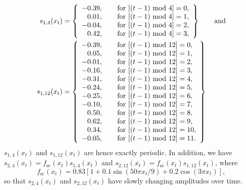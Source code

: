 \begin{align*}
s_{1,4}(x_t)&=\left\{\begin{array}{rl}
-0.39, & \hspace{3mm}\text{ for }[(t-1)\text{ mod } 4] = 0,\\ 0.01, & \hspace{3mm}\text{ for }[(t-1)\text{ mod } 4] = 1,\\ -0.04, & \hspace{3mm}\text{ for }[(t-1)\text{ mod } 4] = 2,\\ 0.42, & \hspace{3mm}\text{ for }[(t-1)\text{ mod } 4] = 3,\end{array}\right\}  \hspace{6mm}\text{ and}\\
s_{1,12}(x_t)&=\left\{\begin{array}{rl}
-0.39, & \hspace{3mm}\text{ for }[(t-1)\text{ mod } 12] = 0,\\
0.05, & \hspace{3mm}\text{ for }[(t-1)\text{ mod } 12] = 1,\\
-0.01, & \hspace{3mm}\text{ for }[(t-1)\text{ mod } 12] = 2,\\
-0.16, & \hspace{3mm}\text{ for }[(t-1)\text{ mod } 12] = 3,\\
-0.31, & \hspace{3mm}\text{ for }[(t-1)\text{ mod } 12] = 4,\\
-0.24, & \hspace{3mm}\text{ for }[(t-1)\text{ mod } 12] = 5,\\
-0.25, & \hspace{3mm}\text{ for }[(t-1)\text{ mod } 12] = 6,\\
-0.10, & \hspace{3mm}\text{ for }[(t-1)\text{ mod } 12] = 7,\\
0.50, & \hspace{3mm}\text{ for }[(t-1)\text{ mod } 12] = 8,\\
0.62, & \hspace{3mm}\text{ for }[(t-1)\text{ mod } 12] = 9,\\
0.34, & \hspace{3mm}\text{ for }[(t-1)\text{ mod } 12] = 10,\\
-0.05, & \hspace{3mm}\text{ for }[(t-1)\text{ mod } 12] = 11.\\
\end{array}\right\}
\end{align*}
\(s_{1,4}(x_t)\) and \(s_{1,12}(x_t)\) are hence exactly periodic. In addition, we have \(s_{2,4}(x_t)=f_{\text{sc}}(x_t)s_{1,4}(x_t)\) and \(s_{2,12}(x_t)=f_{\text{sc}}(x_t)s_{1,12}(x_t)\), where
\begin{equation*}
f_{\text{sc}}(x_t)=0.83 [1 + 0.1 \sin(50\pi x_t/ 9) + 0.2 \cos(3\pi x_t)],
\end{equation*}
so that \(s_{2,4}(x_t)\) and \(s_{2,12}(x_t)\) have slowly changing amplitudes over time.

